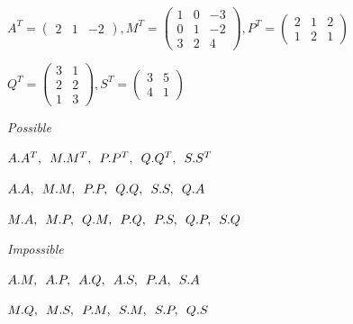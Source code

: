 \documentclass[fleqn]{article}
\begin{document}
\begin{enumerate}
    \bigbreak
  
    \noindent
    $
    A^T=
    \begin{pmatrix}
      2 & 1 & -2
    \end{pmatrix}
    ,
    M^T=
    \begin{pmatrix}
      1 & 0 & -3 \\
      0 & 1 & -2 \\
      3 & 2 & 4
    \end{pmatrix}
    ,
    P^T=
    \begin{pmatrix}
      2 & 1 & 2 \\
      1 & 2 & 1 
    \end{pmatrix}
    $

    $
    Q^T=
    \begin{pmatrix}
      3 & 1  \\
      2 & 2  \\
      1 & 3
    \end{pmatrix}
    ,
    S^T=
    \begin{pmatrix}
      3 & 5 \\
      4 & 1 
    \end{pmatrix}
    $

    \bigbreak

    \emph{Possible}

    $A.A^T, \thinspace\thinspace\thinspace M.M^T, \thinspace\thinspace\thinspace P.P^T, \thinspace\thinspace\thinspace Q.Q^T, \thinspace\thinspace\thinspace S.S^T$

    $A.A, \thinspace\thinspace\thinspace M.M, \thinspace\thinspace\thinspace P.P, \thinspace\thinspace\thinspace Q.Q, \thinspace\thinspace\thinspace S.S, \thinspace\thinspace\thinspace Q.A$

    $M.A, \thinspace\thinspace\thinspace M.P, \thinspace\thinspace\thinspace Q.M, \thinspace\thinspace\thinspace P.Q, \thinspace\thinspace\thinspace P.S, \thinspace\thinspace\thinspace Q.P, \thinspace\thinspace\thinspace S.Q$

    \bigbreak

    \emph{Impossible}


    $A.M, \thinspace\thinspace\thinspace A.P, \thinspace\thinspace\thinspace A.Q , \thinspace\thinspace\thinspace A.S, \thinspace\thinspace\thinspace P.A, \thinspace\thinspace\thinspace S.A$

    $M.Q, \thinspace\thinspace\thinspace M.S, \thinspace\thinspace\thinspace P.M, \thinspace\thinspace\thinspace S.M, \thinspace\thinspace\thinspace S.P, \thinspace\thinspace\thinspace Q.S$


\end{enumerate}
\end{document}
